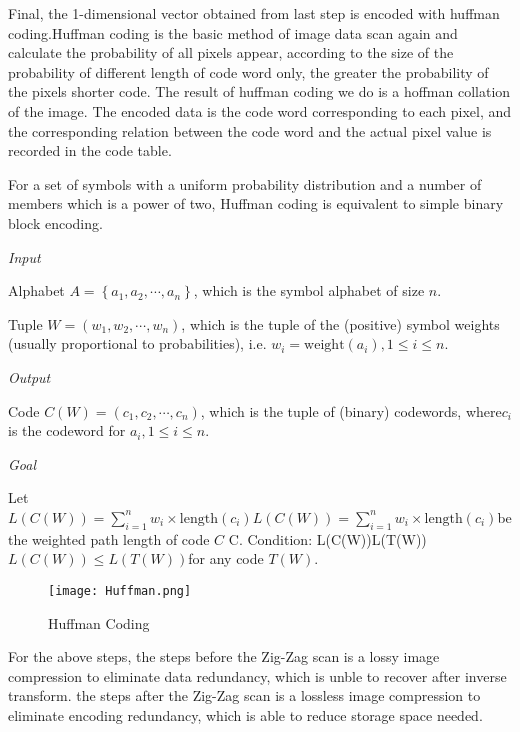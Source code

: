 \documentclass{mcmthesis}
\begin{document}
Final, the 1-dimensional vector obtained from last step is encoded with huffman coding.Huffman coding is the basic method of image data scan again and calculate the probability of all pixels appear, according to the size of the probability of different length of code word only, the greater the probability of the pixels shorter code. The result of huffman coding we do is a hoffman collation of the image. The encoded data is the code word corresponding to each pixel, and the corresponding relation between the code word and the actual pixel value is recorded in the code table.

For a set of symbols with a uniform probability distribution and a number of members which is a power of two, Huffman coding is equivalent to simple binary block encoding.

\emph{Input}

Alphabet  ${\displaystyle A=\left\{a_{1},a_{2},\cdots ,a_{n}\right\}}$, which is the symbol alphabet of size ${\displaystyle n}$.

Tuple ${\displaystyle W=(w_{1},w_{2},\cdots ,w_{n})}$, which is the tuple of the (positive) symbol weights (usually proportional to probabilities), i.e. ${\displaystyle w_{i}=\mathrm {weight} \left(a_{i}\right),1\leq i\leq n}$.

\emph{Output}

Code ${\displaystyle C\left(W\right)=(c_{1},c_{2},\cdots ,c_{n})}$, which is the tuple of (binary) codewords, where$ {\displaystyle c_{i}}$ is the codeword for ${\displaystyle a_{i},1\leq i\leq n}$.

\emph{Goal}

Let ${\displaystyle L\left(C\left(W\right)\right)=\sum _{i=1}^{n}{w_{i}\times \mathrm {length} \left(c_{i}\right)}} {\displaystyle L\left(C\left(W\right)\right)=\sum _{i=1}^{n}{w_{i}\times \mathrm {length} \left(c_{i}\right)}} $be the weighted path length of code ${\displaystyle C}$ C. Condition: {\displaystyle L\left(C\left(W\right)\right)\leq L\left(T\left(W\right)\right)} ${\displaystyle L\left(C\left(W\right)\right)\leq L\left(T\left(W\right)\right)} $for any code ${\displaystyle T\left(W\right)}$. 

\begin{figure}[h]
\centering
\texttt{[image: Huffman.png]}
\caption{Huffman Coding} \label{fig:Huffman Coding}
\end{figure}

For the above steps, the steps before the Zig-Zag scan is a lossy image compression to eliminate data redundancy, which is unble to recover after inverse transform. the steps after the Zig-Zag scan is a lossless image compression to eliminate encoding redundancy, which is able to reduce storage space needed.
\end{document}
